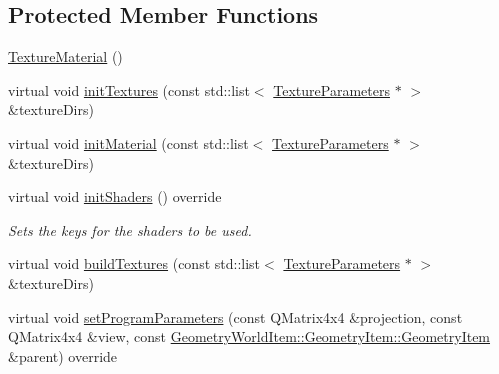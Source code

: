 \subsection*{Protected Member Functions}
\begin{DoxyCompactItemize}
\item 
\mbox{\hyperlink{class_geometry_engine_1_1_geometry_material_1_1_texture_material_a4aee4ff76a14519eac61ebc14d8ca998}{Texture\+Material}} ()
\item 
virtual void \mbox{\hyperlink{class_geometry_engine_1_1_geometry_material_1_1_texture_material_ae2a34b3c00d6aecd9bdc686042cdf892}{init\+Textures}} (const std\+::list$<$ \mbox{\hyperlink{class_geometry_engine_1_1_geometry_material_1_1_texture_parameters}{Texture\+Parameters}} $\ast$ $>$ \&texture\+Dirs)
\item 
virtual void \mbox{\hyperlink{class_geometry_engine_1_1_geometry_material_1_1_texture_material_afbf7007e9d869b23dfbc173841ba5b34}{init\+Material}} (const std\+::list$<$ \mbox{\hyperlink{class_geometry_engine_1_1_geometry_material_1_1_texture_parameters}{Texture\+Parameters}} $\ast$ $>$ \&texture\+Dirs)
\item 
\mbox{\label{class_geometry_engine_1_1_geometry_material_1_1_texture_material_a3c7934e5895c1abc1216e0c700626263}} 
virtual void \mbox{\hyperlink{class_geometry_engine_1_1_geometry_material_1_1_texture_material_a3c7934e5895c1abc1216e0c700626263}{init\+Shaders}} () override
\begin{DoxyCompactList}\small\item\em Sets the keys for the shaders to be used. \end{DoxyCompactList}\item 
virtual void \mbox{\hyperlink{class_geometry_engine_1_1_geometry_material_1_1_texture_material_a39212e653a556734e261ef610ab0ad9f}{build\+Textures}} (const std\+::list$<$ \mbox{\hyperlink{class_geometry_engine_1_1_geometry_material_1_1_texture_parameters}{Texture\+Parameters}} $\ast$ $>$ \&texture\+Dirs)
\item 
virtual void \mbox{\hyperlink{class_geometry_engine_1_1_geometry_material_1_1_texture_material_a985cdde7240f2acb18cd2944c5ca6193}{set\+Program\+Parameters}} (const Q\+Matrix4x4 \&projection, const Q\+Matrix4x4 \&view, const \mbox{\hyperlink{class_geometry_engine_1_1_geometry_world_item_1_1_geometry_item_1_1_geometry_item}{Geometry\+World\+Item\+::\+Geometry\+Item\+::\+Geometry\+Item}} \&parent) override

\end{DoxyCompactItemize}
